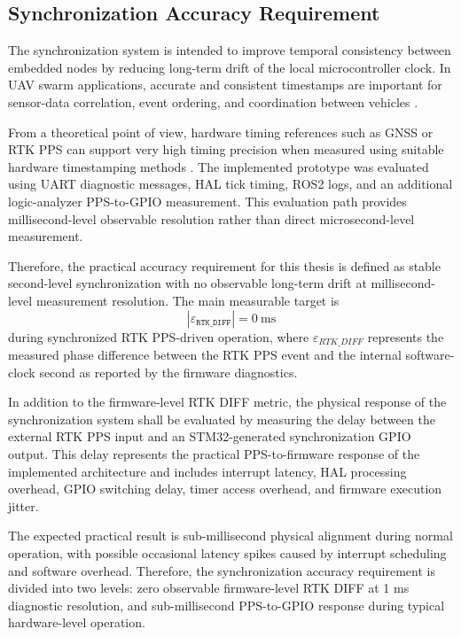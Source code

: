 \subsection{Synchronization Accuracy Requirement}

The synchronization system is intended to improve temporal consistency between embedded nodes by reducing long-term drift of the local microcontroller clock. In UAV swarm applications, accurate and consistent timestamps are important for sensor-data correlation, event ordering, and coordination between vehicles \cite{r1,r5,r11}.

From a theoretical point of view, hardware timing references such as GNSS or RTK PPS can support very high timing precision when measured using suitable hardware timestamping methods \cite{teunissen2017springer}. The implemented prototype was evaluated using UART diagnostic messages, HAL tick timing, ROS2 logs, and an additional logic-analyzer PPS-to-GPIO measurement. This evaluation path provides millisecond-level observable resolution rather than direct microsecond-level measurement.

Therefore, the practical accuracy requirement for this thesis is defined as stable second-level synchronization with no observable long-term drift at millisecond-level measurement resolution. The main measurable target is
\begin{equation}
\left| \varepsilon_\texttt{RTK\_DIFF} \right| = 0~\mathrm{ms}
\end{equation}
during synchronized RTK PPS-driven operation, where $\varepsilon_{RTK\_DIFF}$ represents the measured phase difference between the RTK PPS event and the internal software-clock second as reported by the firmware diagnostics.

In addition to the firmware-level RTK DIFF metric, the physical response of the synchronization system shall be evaluated by measuring the delay between the external RTK PPS input and an STM32-generated synchronization GPIO output. This delay represents the practical PPS-to-firmware response of the implemented architecture and includes interrupt latency, HAL processing overhead, GPIO switching delay, timer access overhead, and firmware execution jitter.

The expected practical result is sub-millisecond physical alignment during normal operation, with possible occasional latency spikes caused by interrupt scheduling and software overhead. Therefore, the synchronization accuracy requirement is divided into two levels: zero observable firmware-level RTK DIFF at 1 ms diagnostic resolution, and sub-millisecond PPS-to-GPIO response during typical hardware-level operation.

